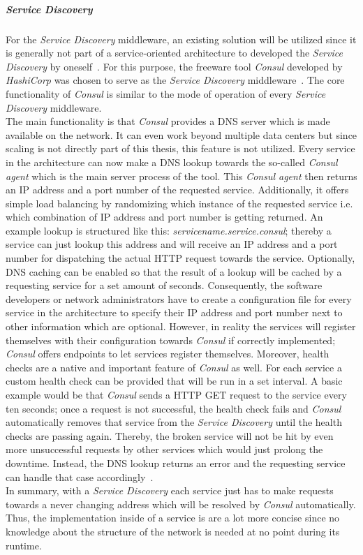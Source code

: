 \documentclass[12pt,a4paper]{report}
\begin{document}
\subparagraph{Service Discovery}
For the \textit{Service Discovery} middleware, an existing solution will be
utilized since it is generally not part of a service-oriented architecture
to developed the \textit{Service Discovery} by oneself~\cn.
For this purpose, the freeware tool \textit{Consul} developed by \textit{HashiCorp}
was chosen to serve as the \textit{Service Discovery} middleware~\cite{consul}.
The core functionality of \textit{Consul} is similar to the mode of operation
of every \textit{Service Discovery} middleware.\\
The main functionality is that \textit{Consul} provides a DNS server which is
made available on the network. It can even work beyond multiple data centers
but since scaling is not directly part of this thesis, this feature is not utilized.
Every service in the architecture can now make a DNS lookup towards the so-called
\textit{Consul agent} which is the main server process of the tool.
This \textit{Consul agent} then returns an IP address and a
port number of the requested service. Additionally, it offers simple
load balancing by randomizing which instance of the requested service
i.e. which combination of IP address and port number is getting returned.
An example lookup is structured like this: \textit{servicename.service.consul};
thereby a service can just lookup this address and will receive an IP address
and a port number for dispatching the actual HTTP request towards the service.
Optionally, DNS caching can be enabled so that the result of a lookup will be
cached by a requesting service for a set amount of seconds.
Consequently, the software developers or network administrators have to
create a configuration file for every service in the architecture to specify
their IP address and port number next to other information which are optional.
However, in reality the services will register themselves with their configuration
towards \textit{Consul} if correctly implemented;
\textit{Consul} offers endpoints to let services register themselves.
Moreover, health checks are a native and important feature of \textit{Consul}
as well. For each service a custom health check can be provided that
will be run in a set interval. A basic example would be that \textit{Consul}
sends a HTTP GET request to the service every ten seconds;
once a request is not successful, the health check fails and \textit{Consul}
automatically removes that service from the \textit{Service Discovery}
until the health checks are passing again. Thereby, the broken service will
not be hit by even more unsuccessful requests by other services which would just
prolong the downtime. Instead, the DNS lookup returns an error and the
requesting service can handle that case accordingly~\cite{consul}.\\
In summary, with a \textit{Service Discovery} each service just has to
make requests towards a never changing address which will be resolved by
\textit{Consul} automatically. Thus, the implementation inside of a service is
are a lot more concise since no knowledge about the structure of the network
is needed at no point during its runtime.
\end{document}
